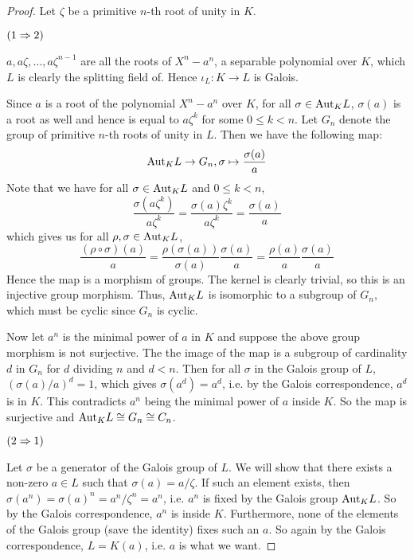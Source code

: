 \documentclass[../book.tex]{subfiles}
\begin{document}
\begin{proof}
    
    Let $\zeta$ be a primitive $n$-th root of unity in $K$.
    
    $(1 \Rightarrow 2)$
    
    $a, a\zeta,\dots,a\zeta^{n-1}$ are all the roots of $X^n - a^n$,
    a separable polynomial over $K$,
    which $L$ is clearly the splitting field of. 
    Hence $\iota_L : K \to L$ is Galois.
    
    Since $a$ is a root of the polynomial $X^n - a^n$ over $K$,
    for all $\sigma \in \mathrm{Aut}_{K}L$, $\sigma(a)$ is a root as well and
    hence is equal to $a \zeta^k$ for some $0 \leq k < n$. 
    Let $G_n$ denote the group of primitive $n$-th roots of unity in $L$.
    Then we have the following map: \[
        \mathrm{Aut}_{K}L \to G_n , \sigma \mapsto \frac{\sigma(a)}{a}
    \]
    Note that we have for all $\sigma \in \mathrm{Aut}_{K}L$ and $0 \leq k < n$, \[
        \frac{\sigma(a \zeta^k)}{a\zeta^k} 
        = \frac{\sigma(a)\zeta^k}{a\zeta^k}
        = \frac{\sigma(a)}{a}
    \]  
    which gives us for all $\rho, \sigma \in \mathrm{Aut}_{K}L$, \[
        \frac{(\rho \circ \sigma)(a)}{a} 
        = \frac{\rho(\sigma(a))}{\sigma(a)} \frac{\sigma(a)}{a}
        = \frac{\rho(a)}{a} \frac{\sigma(a)}{a}
    \]
    Hence the map is a morphism of groups. 
    The kernel is clearly trivial, so this is an injective group morphism.
    Thus, $\mathrm{Aut}_{K}L$ is isomorphic to a subgroup of $G_n$,
    which must be cyclic since $G_n$ is cyclic. 
    
    Now let $a^n$ is the minimal power of $a$ in $K$
    and suppose the above group morphism is not surjective. 
    The the image of the map is a subgroup of cardinality $d$ in $G_n$
    for $d$ dividing $n$ and $d < n$. 
    Then for all $\sigma$ in the Galois group of $L$,
    $(\sigma(a)/a)^d = 1$, which gives $\sigma(a^d) = a^d$,
    i.e. by the Galois correspondence, $a^d$ is in $K$.
    This contradicts $a^n$ being the minimal power of $a$ inside $K$.
    So the map is surjective and $\mathrm{Aut}_{K}L \cong G_n \cong C_n$. 
    
    $(2 \Rightarrow 1)$
    
    Let $\sigma$ be a generator of the Galois group of $L$. 
    We will show that there exists a non-zero $a \in L$ such that 
    $\sigma(a) = a / \zeta$. 
    If such an element exists, 
    then $\sigma(a^n) = \sigma(a)^n = a^n/\zeta^n = a^n$,
    i.e. $a^n$ is fixed by the Galois group $\mathrm{Aut}_{K}L$.
    So by the Galois correspondence, $a^n$ is inside $K$.
    Furthermore, none of the elements of the Galois group (save the identity)
    fixes such an $a$. 
    So again by the Galois correspondence, $L = K(a)$,
    i.e. $a$ is what we want. 
    

\end{proof}
\end{document}
